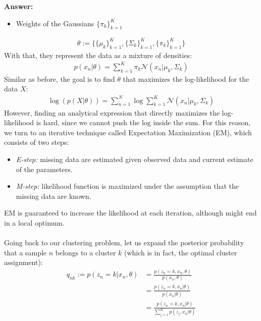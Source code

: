 \documentclass{article}
\newenvironment{QandA}{\begin{enumerate}[label=\arabic*.]}{\end{enumerate}}
\newenvironment{InnerQandA}{\begin{enumerate}[label=\roman*.]}{\end{enumerate}}
\newenvironment{answer}{\par\normalfont \textbf{Answer:}}{}
\newcommand{\g}{\vert}
\begin{document}
\begin{QandA}
\begin{InnerQandA}
\begin{answer}
\begin{itemize}
                \item Weights of the Gaussians $\{\pi_k\}_{k=1}^K$
            \end{itemize}
            \begin{align*}
                \theta := \{\{\mu_k\}_{k=1}^K, \{\Sigma_k\}_{k=1}^K, \{\pi_k\}_{k=1}^K\}
            \end{align*}
            With that, they represent the data as a mixture of densities:
            \begin{align*}
                p(x_n \g \theta) = \sum_{k=1}^K \pi_k \mathcal{N} (x_n \g \mu_k, \Sigma_k)
            \end{align*}
            Similar as before, the goal is to find $\theta$ that maximizes the log-likelihood for the data $X$:
            \begin{align*}
                \log(p(X \g \theta)) = \sum_{n=1}^N \log \sum_{k=1}^K \mathcal{N} (x_n \g \mu_k, \Sigma_k)
            \end{align*}
            However, finding an analytical expression that directly maximizes the log-likelihood is hard, since we cannot push the log inside the sum. For this reason, we turn to an iterative technique called Expectation Maximization (EM), which consists of two steps:
            \begin{itemize}
                \item \textit{E-step:} missing data are estimated given observed data and current estimate of the parameters.
                \item \textit{M-step:} likelihood function is maximized under the assumption that the missing data are known.
            \end{itemize}
            EM is guaranteed to increase the likelihood at each iteration, although might end in a local optimum.\\\\
            Going back to our clustering problem, let us expand the posterior probability that a sample $n$ belongs to a cluster $k$ (which is in fact, the optimal cluster assignment):
            \begin{align*}
                q_{nk} := p(z_n = k \g x_n, \theta) &= \frac{p(z_n = k, x_n, \theta)}{p(x_n, \theta)} \\
                &= \frac{p(z_n = k, x_n \g \theta)}{p(x_n \g \theta)} \\
                &= \frac{p(z_n = k, x_n \g \theta)}{\sum_{j=1}^K p(z_j, x_n \g \theta)} \\

\end{align*}
\end{answer}
\end{InnerQandA}
\end{QandA}
\end{document}
